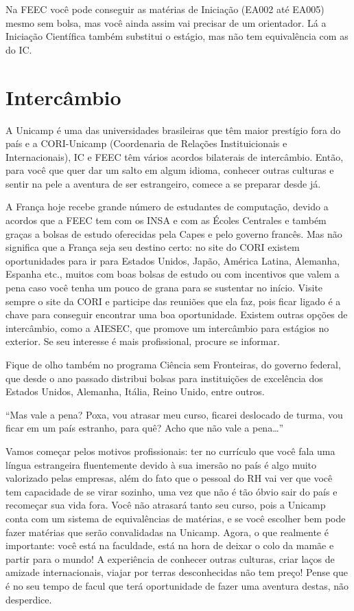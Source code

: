Na FEEC você pode conseguir as matérias de Iniciação (EA002 até EA005) mesmo sem
bolsa, mas você ainda assim vai precisar de um orientador. Lá a Iniciação
Científica também substitui o estágio, mas não tem equivalência com as do IC.

\section{Intercâmbio}

A Unicamp é uma das universidades brasileiras que têm maior prestígio fora do país
e a CORI-Unicamp (Coordenaria de Relações Instituicionais e Internacionais), IC e FEEC têm
vários acordos bilaterais de intercâmbio. Então, para você que quer dar um salto
em algum idioma, conhecer outras culturas e sentir na pele a aventura de ser
estrangeiro, comece a se preparar desde já.

A França hoje recebe grande número de estudantes de computação, devido a acordos que
a FEEC tem com os INSA e com as Écoles Centrales e também graças a bolsas de
estudo oferecidas pela Capes e pelo governo francês. Mas não significa que
a França seja seu destino certo: no site do CORI existem oportunidades para ir
para Estados Unidos, Japão, América Latina, Alemanha, Espanha etc., muitos com boas bolsas
de estudo ou com incentivos que valem a pena caso você
tenha um pouco de grana para se sustentar no início. Visite sempre o site da
CORI e participe das reuniões que ela faz, pois ficar ligado é a chave para conseguir
encontrar uma boa oportunidade. Existem outras opções de intercâmbio, como
a AIESEC, que promove um intercâmbio para estágios no exterior. Se seu interesse
é mais profissional, procure se informar.

Fique de olho também no programa Ciência sem Fronteiras, do governo federal,
que desde o ano passado distribui bolsas para instituições de excelência dos Estados Unidos, Alemanha, Itália,
Reino Unido, entre outros.

``Mas vale a pena? Poxa, vou atrasar meu curso, ficarei deslocado de turma, vou
ficar em um país estranho, para quê? Acho que não vale a pena{\dots}''

Vamos começar pelos motivos profissionais: ter no currículo que você fala uma
língua estrangeira fluentemente devido à sua imersão no país é algo muito
valorizado pelas empresas, além do fato que o pessoal do RH vai ver que você tem
capacidade de se virar sozinho, uma vez que não é tão óbvio sair do país
e recomeçar sua vida fora. Você não atrasará tanto seu curso, pois a Unicamp
conta com um sistema de equivalências de matérias, e se você escolher bem pode
fazer matérias que serão convalidadas na Unicamp. Agora, o que realmente
é importante: você está na faculdade, está na hora de deixar o colo da mamãe
e partir para o mundo! A experiência de conhecer outras culturas, criar
laços de amizade internacionais, viajar por terras
desconhecidas não tem preço! Pense que é no seu tempo de facul que terá
oportunidade de fazer uma aventura destas, não desperdice.

